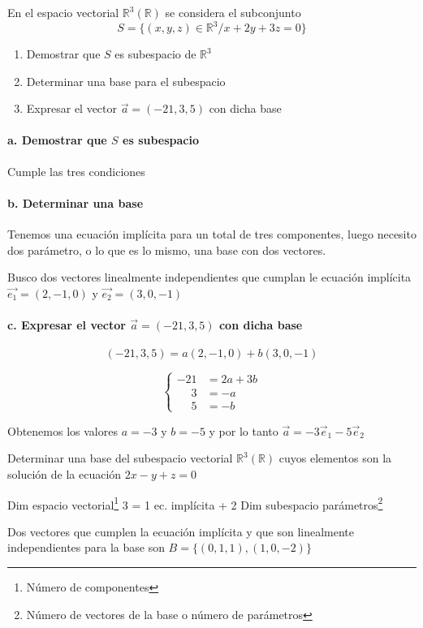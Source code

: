 \begin{problema}{\cite[4p335]{palacios}}{
	En el espacio vectorial $\mathbb{R}^3(\mathbb{R})$ se considera el subconjunto
	$$S=\{(x,y,z)\in \mathbb{R}^3 / x+2y+3z=0\}$$
	\begin{enumerate}
		\item Demostrar que $S$ es subespacio de $\mathbb{R}^3$
		\item Determinar una base para el subespacio
		\item Expresar el vector $\vec{a}=(-21,3,5)$ con dicha base
	\end{enumerate}
	}
	\paragraph{a. Demostrar que $S$ es subespacio} Cumple las tres condiciones
	\paragraph{b. Determinar una base} Tenemos una ecuación implícita para un total de 
	tres componentes, luego necesito
	dos parámetro, o lo que es lo mismo, una base con dos vectores.

	Busco dos vectores linealmente independientes que cumplan le ecuación implícita
	$\vec{e_1}=(2,-1,0)$ y $\vec{e_2}=(3,0,-1)$

	\paragraph{c. Expresar el vector $\vec{a}=(-21,3,5)$ con dicha base}

	$$(-21,3,5)=a(2,-1,0)+b(3,0,-1)$$

	$$\begin{cases}
		-21 &=2a+3b \\
		\phantom{-2}  3 &=-a \\
		\phantom{-2}  5 &=-b
	\end{cases}$$

	Obtenemos los valores $a=-3$ y $b=-5$ y por lo tanto $\vec{a}=-3\vec{e}_1-5\vec{e}_2$
\end{problema}

\begin{problema}{\cite[5p336]{palacios}}{
	Determinar una base del subespacio vectorial $\mathbb{R}^3(\mathbb{R})$ cuyos elementos son
	la solución de la ecuación $2x-y+z=0$
	}
	\begin{center}
		Dim espacio vectorial\footnote[1]{Número de componentes} 3 = 1 ec. implícita + 2 Dim
		subespacio
		parámetros\footnote[2]{Número de vectores de la base o número de parámetros}
	\end{center}
	Dos vectores que cumplen la ecuación implícita y que son linealmente independientes 
	para la base son $B=\{(0,1,1),(1,0,-2)\}$
\end{problema}

